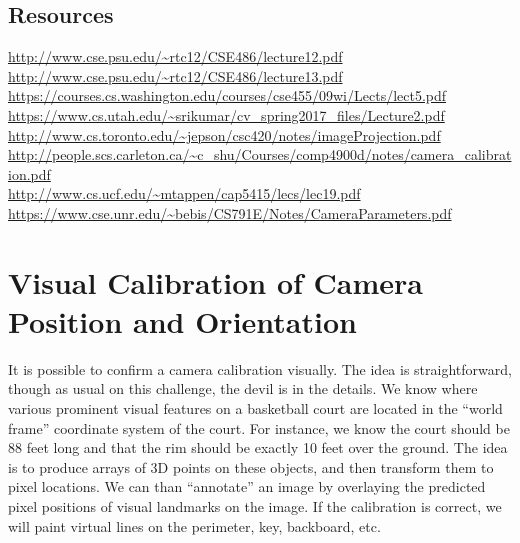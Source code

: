 \documentclass{article}
\begin{document}
\subsection{Resources}
\url{http://www.cse.psu.edu/~rtc12/CSE486/lecture12.pdf} \\
\url{http://www.cse.psu.edu/~rtc12/CSE486/lecture13.pdf} \\
\url{https://courses.cs.washington.edu/courses/cse455/09wi/Lects/lect5.pdf} \\
\url{https://www.cs.utah.edu/~srikumar/cv_spring2017_files/Lecture2.pdf} \\
\url{http://www.cs.toronto.edu/~jepson/csc420/notes/imageProjection.pdf} \\
\url{http://people.scs.carleton.ca/~c_shu/Courses/comp4900d/notes/camera_calibration.pdf} \\
\url{http://www.cs.ucf.edu/~mtappen/cap5415/lecs/lec19.pdf} \\
\url{https://www.cse.unr.edu/~bebis/CS791E/Notes/CameraParameters.pdf} \\

\newpage
\section{Visual Calibration of Camera Position and Orientation}
It is possible to confirm a camera calibration visually.  
The idea is straightforward, though as usual on this challenge, the devil is in the details.
We know where various prominent visual features on a basketball court are located in the
``world frame'' coordinate system of the court.  
For instance, we know the court should be 88 feet long and that the rim should be exactly 10 feet over the ground.
The idea is to produce arrays of 3D points on these objects, and then transform them to pixel locations.
We can than ``annotate'' an image by overlaying the predicted pixel positions of visual landmarks on the image.
If the calibration is correct, we will paint virtual lines on the perimeter, key, backboard, etc.
\end{document}
